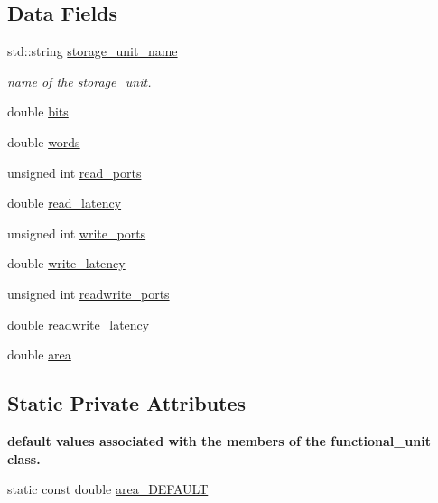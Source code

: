 \subsection*{Data Fields}
\begin{DoxyCompactItemize}
\item 
std\+::string \hyperlink{structstorage__unit_a6a4d753ad72a7879c6a3b66742daeb18}{storage\+\_\+unit\+\_\+name}
\begin{DoxyCompactList}\small\item\em name of the \hyperlink{structstorage__unit}{storage\+\_\+unit}. \end{DoxyCompactList}\item 
double \hyperlink{structstorage__unit_a29869aa61205e453a6382fe2ff83fd31}{bits}
\item 
double \hyperlink{structstorage__unit_a3c99b278e1f51cc7ba7b4d4360a7d00c}{words}
\item 
unsigned int \hyperlink{structstorage__unit_a3f6be43b8c26f74d9a742b9ae5eaa7c4}{read\+\_\+ports}
\item 
double \hyperlink{structstorage__unit_a30c59a9fd1f55c56c9f74984a66dc52e}{read\+\_\+latency}
\item 
unsigned int \hyperlink{structstorage__unit_a1d5a2712f0fe954bc755c1b3626978d6}{write\+\_\+ports}
\item 
double \hyperlink{structstorage__unit_ac9ff4d36f23e54364642b0f0c22c752e}{write\+\_\+latency}
\item 
unsigned int \hyperlink{structstorage__unit_ab066a353184a3b9f75b6fcdaebeab73a}{readwrite\+\_\+ports}
\item 
double \hyperlink{structstorage__unit_aa419ea4c93143095097a124bfd624837}{readwrite\+\_\+latency}
\item 
double \hyperlink{structstorage__unit_a6167f604db37a9d99fef52573443001f}{area}
\end{DoxyCompactItemize}
\subsection*{Static Private Attributes}
\begin{Indent}\textbf{ default values associated with the members of the functional\+\_\+unit class.}\par
\begin{DoxyCompactItemize}
\item 
static const double \hyperlink{structstorage__unit_abb6b467e602b893508552d0d91e257de}{area\+\_\+\+D\+E\+F\+A\+U\+LT}
\end{DoxyCompactItemize}
\end{Indent}
